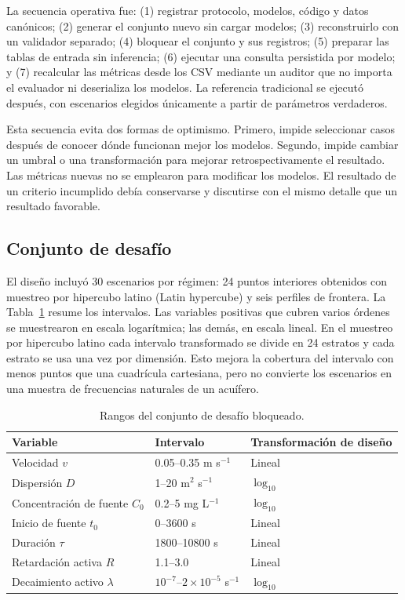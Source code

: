\documentclass[11pt,a4paper]{article}
\begin{document}
La secuencia operativa fue: (1) registrar protocolo, modelos, código y datos
canónicos; (2) generar el conjunto nuevo sin cargar modelos; (3) reconstruirlo
con un validador separado; (4) bloquear el conjunto y sus registros; (5) preparar las tablas de
entrada sin inferencia; (6) ejecutar una consulta persistida por modelo; y
(7) recalcular las métricas desde los CSV mediante un auditor que no importa el
evaluador ni deserializa los modelos. La referencia tradicional se ejecutó
después, con escenarios elegidos únicamente a partir de parámetros verdaderos.

Esta secuencia evita dos formas de optimismo. Primero, impide seleccionar casos
después de conocer dónde funcionan mejor los modelos. Segundo, impide cambiar
un umbral o una transformación para mejorar retrospectivamente el resultado.
Las métricas nuevas no se emplearon para modificar los modelos. El resultado de
un criterio incumplido debía conservarse y discutirse con el mismo detalle que
un resultado favorable.

\subsection{Conjunto de desafío}

El diseño incluyó 30 escenarios por régimen: 24 puntos interiores obtenidos con
muestreo por hipercubo latino (Latin hypercube) \cite{mckay1979} y seis perfiles de frontera. La
Tabla~\ref{tab:ranges} resume los intervalos. Las variables positivas que
cubren varios órdenes se muestrearon en escala logarítmica; las demás, en escala
lineal. En el muestreo por hipercubo latino cada intervalo transformado se divide en
24 estratos y cada estrato se usa una vez por dimensión. Esto mejora la
cobertura del intervalo con menos puntos que una cuadrícula cartesiana, pero no
convierte los escenarios en una muestra de frecuencias naturales de un acuífero.

\begin{table}[htbp]
\centering
\caption{Rangos del conjunto de desafío bloqueado.}
\label{tab:ranges}
\begin{tabular}{@{}lll@{}}
\toprule
Variable & Intervalo & Transformación de diseño \\
\midrule
Velocidad $v$ & 0.05--0.35 m s$^{-1}$ & Lineal \\
Dispersión $D$ & 1--20 m$^2$ s$^{-1}$ & $\log_{10}$ \\
Concentración de fuente $C_0$ & 0.2--5 mg L$^{-1}$ & $\log_{10}$ \\
Inicio de fuente $t_0$ & 0--3600 s & Lineal \\
Duración $\tau$ & 1800--10800 s & Lineal \\
Retardación activa $R$ & 1.1--3.0 & Lineal \\
Decaimiento activo $\lambda$ & $10^{-7}$--$2\times10^{-5}$ s$^{-1}$ & $\log_{10}$ \\
\bottomrule
\end{tabular}
\end{table}
\end{document}
